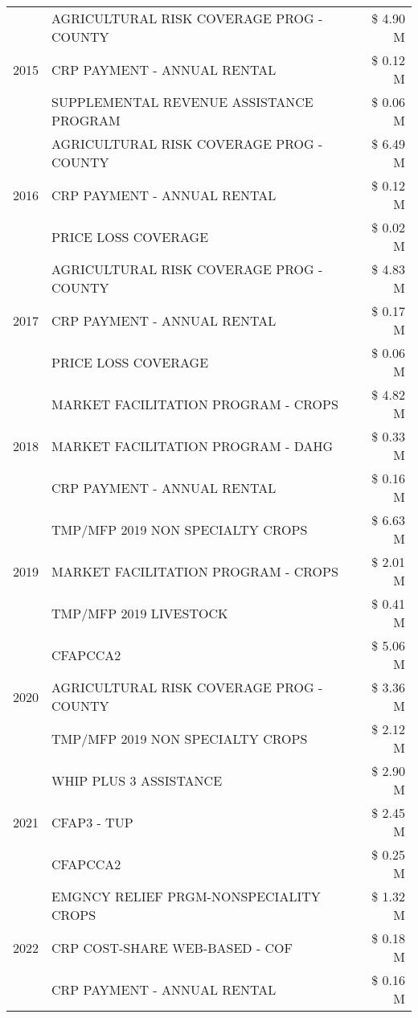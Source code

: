 \begin{tabular}{llr}
\cline{1-3}
\multirow[t]{3}{*}{2015} & AGRICULTURAL RISK COVERAGE PROG - COUNTY & \$ 4.90 M \\
 & CRP PAYMENT - ANNUAL RENTAL & \$ 0.12 M \\
 & SUPPLEMENTAL REVENUE ASSISTANCE PROGRAM & \$ 0.06 M \\
\cline{1-3}
\multirow[t]{3}{*}{2016} & AGRICULTURAL RISK COVERAGE PROG - COUNTY & \$ 6.49 M \\
 & CRP PAYMENT - ANNUAL RENTAL & \$ 0.12 M \\
 & PRICE LOSS COVERAGE & \$ 0.02 M \\
\cline{1-3}
\multirow[t]{3}{*}{2017} & AGRICULTURAL RISK COVERAGE PROG - COUNTY & \$ 4.83 M \\
 & CRP PAYMENT - ANNUAL RENTAL & \$ 0.17 M \\
 & PRICE LOSS COVERAGE & \$ 0.06 M \\
\cline{1-3}
\multirow[t]{3}{*}{2018} & MARKET FACILITATION PROGRAM - CROPS & \$ 4.82 M \\
 & MARKET FACILITATION PROGRAM - DAHG & \$ 0.33 M \\
 & CRP PAYMENT - ANNUAL RENTAL & \$ 0.16 M \\
\cline{1-3}
\multirow[t]{3}{*}{2019} & TMP/MFP 2019 NON SPECIALTY CROPS & \$ 6.63 M \\
 & MARKET FACILITATION PROGRAM - CROPS & \$ 2.01 M \\
 & TMP/MFP 2019 LIVESTOCK & \$ 0.41 M \\
\cline{1-3}
\multirow[t]{3}{*}{2020} & CFAPCCA2 & \$ 5.06 M \\
 & AGRICULTURAL RISK COVERAGE PROG - COUNTY & \$ 3.36 M \\
 & TMP/MFP 2019 NON SPECIALTY CROPS & \$ 2.12 M \\
\cline{1-3}
\multirow[t]{3}{*}{2021} & WHIP PLUS 3 ASSISTANCE & \$ 2.90 M \\
 & CFAP3 - TUP & \$ 2.45 M \\
 & CFAPCCA2 & \$ 0.25 M \\
\cline{1-3}
\multirow[t]{3}{*}{2022} & EMGNCY RELIEF PRGM-NONSPECIALITY CROPS & \$ 1.32 M \\
 & CRP COST-SHARE WEB-BASED - COF & \$ 0.18 M \\
 & CRP PAYMENT - ANNUAL RENTAL & \$ 0.16 M \\
\cline{1-3}
\bottomrule
\end{tabular}

